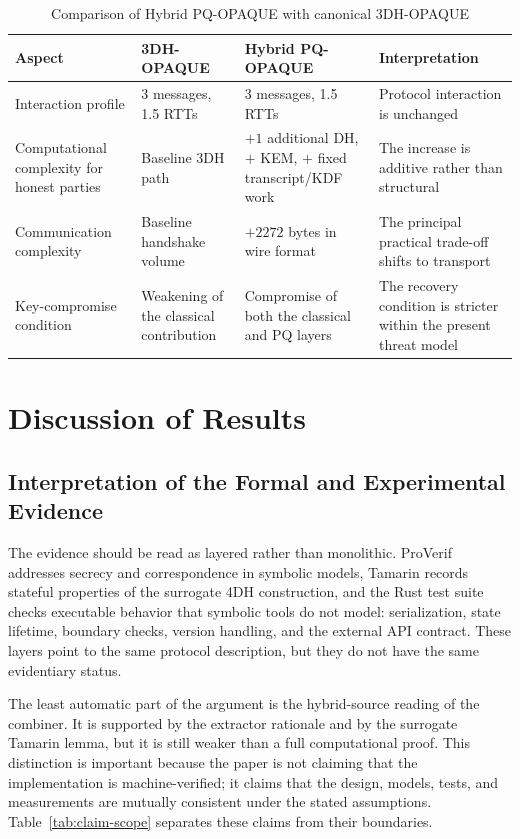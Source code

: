 \documentclass[preprint,12pt]{elsarticle}
\theoremstyle{remark}
\begin{document}
\begin{table}[htbp]
\caption{Comparison of Hybrid PQ-OPAQUE with canonical 3DH-OPAQUE}
\label{tab:baseline-comparison}
\centering\scriptsize
\begin{tabularx}{\textwidth}{@{}L{3.3cm}L{2.9cm}L{3.1cm}X@{}}
\toprule
Aspect & 3DH-OPAQUE & Hybrid PQ-OPAQUE & Interpretation \\
\midrule
Interaction profile & 3 messages, 1.5 RTTs & 3 messages, 1.5 RTTs & Protocol interaction is unchanged \\
Computational complexity for honest parties & Baseline 3DH path & $+1$ additional DH, $+$ KEM, $+$ fixed transcript/KDF work & The increase is additive rather than structural \\
Communication complexity & Baseline handshake volume & $+2272$ bytes in wire format & The principal practical trade-off shifts to transport \\
Key-compromise condition & Weakening of the classical contribution & Compromise of both the classical and PQ layers & The recovery condition is stricter within the present threat model \\
\bottomrule
\end{tabularx}
\end{table}

\section{Discussion of Results}

\subsection{Interpretation of the Formal and Experimental Evidence}

The evidence should be read as layered rather than monolithic. ProVerif
addresses secrecy and correspondence in symbolic models, Tamarin records
stateful properties of the surrogate 4DH construction, and the Rust test
suite checks executable behavior that symbolic tools do not model:
serialization, state lifetime, boundary checks, version handling, and the
external API contract. These layers point to the same protocol description, but
they do not have the same evidentiary status.

The least automatic part of the argument is the hybrid-source reading of the
combiner. It is supported by the extractor rationale and by the
surrogate Tamarin lemma, but it is still weaker than a full
computational proof. This distinction is important because the paper is
not claiming that the implementation is machine-verified; it claims that
the design, models, tests, and measurements are mutually consistent
under the stated assumptions.
Table~\ref{tab:claim-scope} separates these claims from their
boundaries.
\end{document}
